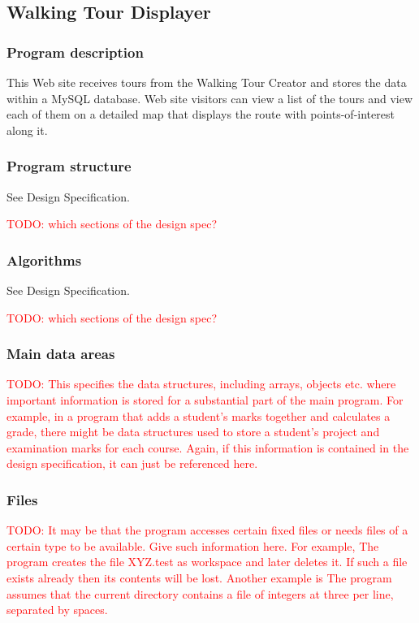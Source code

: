 \documentclass{project}
\begin{document}
\newpage

\subsection{Walking Tour Displayer}

\subsubsection{Program description}
This Web site receives tours from the Walking Tour Creator and stores the data within a MySQL database. Web site visitors can view a list of the tours and view each of them on a detailed map that displays the route with points-of-interest along it.

\subsubsection{Program structure}
See Design Specification.\cite{se.14.design}

\textcolor{red}{TODO: which sections of the design spec?}

\subsubsection{Algorithms}
See Design Specification.\cite{se.14.design}

\textcolor{red}{TODO: which sections of the design spec?}

\subsubsection{Main data areas}
\textcolor{red}{TODO: This specifies the data structures, including arrays, objects etc. where important information is stored for a substantial part of the main program. For example, in a program that adds a student’s marks together and calculates a grade, there might be data structures used to store a student’s project and examination marks for each course. Again, if this information is contained in the design specification, it can just be referenced here.}

\subsubsection{Files}
\textcolor{red}{TODO: It may be that the program accesses certain fixed files or needs files of a certain type to be available.
Give such information here. For example, The program creates the file XYZ.test as workspace and later deletes it. If such a file exists already then its contents will be lost. Another example is The program assumes that the current directory contains a file of integers at three per line, separated by spaces.}
\end{document}
